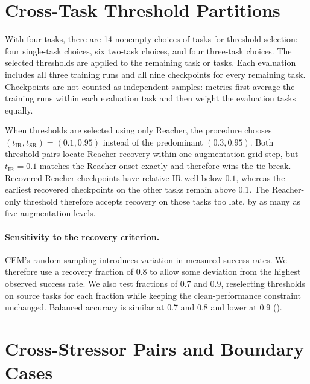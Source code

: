 


\FloatBarrier
\section{Cross-Task Threshold Partitions}\label{sec:appendix-cross-task}

With four tasks, there are 14 nonempty choices of tasks for threshold
selection: four single-task choices, six two-task choices, and four three-task
choices. The selected thresholds are applied to the remaining task or tasks.
Each evaluation includes all three training runs and all nine checkpoints for
every remaining task. Checkpoints are not counted as independent samples:
metrics first average the training runs within each evaluation task and then
weight the evaluation tasks equally.

When thresholds are selected using only Reacher, the procedure chooses
$(t_{\mathrm{IR}},t_{\mathrm{SR}})=(0.1,0.95)$ instead of the predominant
$(0.3,0.95)$. Both threshold pairs locate Reacher recovery within one
augmentation-grid step, but $t_{\mathrm{IR}}=0.1$ matches the Reacher onset
exactly and therefore wins the tie-break. Recovered Reacher checkpoints have
relative IR well below $0.1$, whereas the earliest recovered checkpoints on
the other tasks remain above $0.1$. The Reacher-only threshold therefore
accepts recovery on those tasks too late, by as many as five augmentation
levels.



\paragraph{Sensitivity to the recovery criterion.}
CEM's random sampling introduces variation in measured success rates.
We therefore use a recovery fraction of 0.8 to allow some deviation from the
highest observed success rate. We also test fractions of 0.7 and 0.9,
reselecting thresholds on source tasks for each fraction while keeping the
clean-performance constraint unchanged. Balanced accuracy is similar at 0.7
and 0.8 and lower at 0.9 ().



\FloatBarrier
\section{Cross-Stressor Pairs and Boundary Cases}
\label{sec:appendix-cross-stressor}

